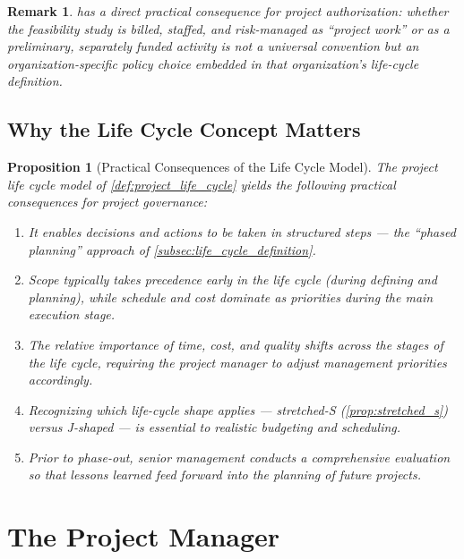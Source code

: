 \documentclass[12pt, a4paper]{report}
\theoremstyle{engnotes}
\newtheorem{prop}{Proposition}[section]
\newtheorem{remark}{Remark}[section]
\begin{document}
\begin{remark}
     has a direct practical consequence for project authorization: whether the feasibility study is billed, staffed, and risk-managed as ``project work'' or as a preliminary, separately funded activity is not a universal convention but an organization-specific policy choice embedded in that organization's life-cycle definition.
\end{remark}

\subsection{Why the Life Cycle Concept Matters}
\label{subsec:why_life_cycle_matters}

\begin{prop}[Practical Consequences of the Life Cycle Model]\label{prop:life_cycle_consequences}
    The project life cycle model of \cref{def:project_life_cycle} yields the following practical consequences for project governance:
    \begin{enumerate}
        \item It enables decisions and actions to be taken in structured steps --- the ``phased planning'' approach of \cref{subsec:life_cycle_definition}.
        \item Scope typically takes precedence early in the life cycle (during defining and planning), while schedule and cost dominate as priorities during the main execution stage.
        \item The relative importance of time, cost, and quality shifts across the stages of the life cycle, requiring the project manager to adjust management priorities accordingly.
        \item Recognizing which life-cycle shape applies --- stretched-S (\cref{prop:stretched_s}) versus J-shaped --- is essential to realistic budgeting and scheduling.
        \item Prior to phase-out, senior management conducts a comprehensive evaluation so that lessons learned feed forward into the planning of future projects.
    \end{enumerate}
\end{prop}

\section{The Project Manager}
\label{sec:project_manager}
\end{document}
